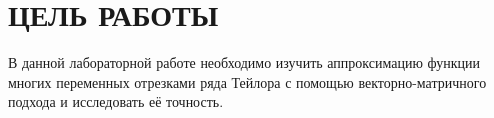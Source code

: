 \section{ЦЕЛЬ РАБОТЫ}

В данной лабораторной работе необходимо изучить аппроксимацию функции многих
переменных отрезками ряда Тейлора с помощью векторно-матричного подхода и
исследовать её точность.